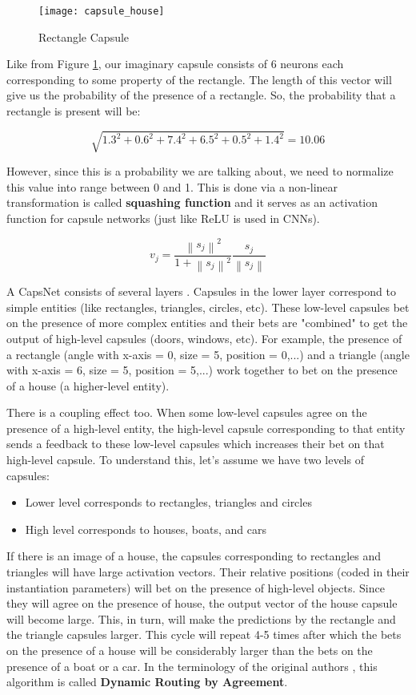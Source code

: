 \documentclass[11pt,twocolumn,letterpaper]{article}
\newcommand{\norm}[1]{\left\lVert#1\right\rVert}
\begin{document}
\begin{figure}[h]
\texttt{[image: capsule\_house]}
\caption{Rectangle Capsule}
\label{fig:capsule_house}
\centering
\end{figure}

Like from Figure \ref{fig:capsule_house}, our imaginary capsule consists of 6 neurons each corresponding to some property of the rectangle. The length of this vector will give us the probability of the presence of a rectangle. So, the probability that a rectangle is present will be:

\[ \sqrt{1.3^2 + 0.6^2 + 7.4^2 + 6.5^2 + 0.5^2 + 1.4^2} = 10.06 \]

However, since this is a probability we are talking about, we need to normalize this value into range between 0 and 1. This is done via a non-linear transformation is called \textbf{squashing function} and it serves as an activation function for capsule networks (just like ReLU is used in CNNs).

\[ v_j = \frac{\norm{s_j}^2}{1 + \norm{s_j}^2}\frac{s_j}{\norm{s_j}}\]

A CapsNet consists of several layers \cite{capsule4}. Capsules in the lower layer correspond to simple entities (like rectangles, triangles, circles, etc). These low-level capsules bet on the presence of more complex entities and their bets are "combined" to get the output of high-level capsules (doors, windows, etc). For example, the presence of a rectangle (angle with x-axis = 0, size = 5, position = 0,...) and a triangle (angle with x-axis = 6, size = 5, position = 5,...) work together to bet on the presence of a house (a higher-level entity).

There is a coupling effect too. When some low-level capsules agree on the presence of a high-level entity, the high-level capsule corresponding to that entity sends a feedback to these low-level capsules which increases their bet on that high-level capsule. To understand this, let's assume we have two levels of capsules:

\begin{itemize}
\item Lower level corresponds to rectangles, triangles and circles
\item High level corresponds to houses, boats, and cars
\end{itemize}

If there is an image of a house, the capsules corresponding to rectangles and triangles will have large activation vectors. Their relative positions (coded in their instantiation parameters) will bet on the presence of high-level objects. Since they will agree on the presence of house, the output vector of the house capsule will become large. This, in turn, will make the predictions by the rectangle and the triangle capsules larger. This cycle will repeat 4-5 times after which the bets on the presence of a house will be considerably larger than the bets on the presence of a boat or a car. In the terminology of the original authors \cite{capsule1}, this algorithm is called \textbf{Dynamic Routing by Agreement}.
\end{document}
